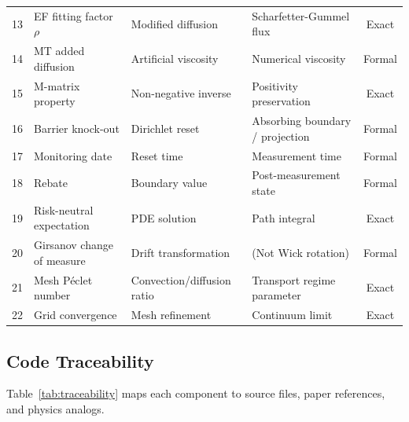 \begin{table}[!t]
\begin{tabular}{clllc}
13 & EF fitting factor $\rho$       & Modified diffusion         & Scharfetter-Gummel flux                   & Exact \\
14 & MT added diffusion             & Artificial viscosity       & Numerical viscosity                       & Formal \\
15 & M-matrix property              & Non-negative inverse       & Positivity preservation                   & Exact \\
16 & Barrier knock-out              & Dirichlet reset            & Absorbing boundary / projection           & Formal \\
17 & Monitoring date                & Reset time                 & Measurement time                          & Formal \\
18 & Rebate                         & Boundary value             & Post-measurement state                    & Formal \\
19 & Risk-neutral expectation       & PDE solution               & Path integral                             & Exact \\
20 & Girsanov change of measure     & Drift transformation       & (Not Wick rotation)                       & Formal \\
21 & Mesh P\'{e}clet number         & Convection/diffusion ratio & Transport regime parameter                & Exact \\
22 & Grid convergence               & Mesh refinement            & Continuum limit                           & Exact \\
\bottomrule
\end{tabular}
\end{table}

\subsection{Code Traceability}

Table~\ref{tab:traceability} maps each component to source files, paper references, and physics analogs.


